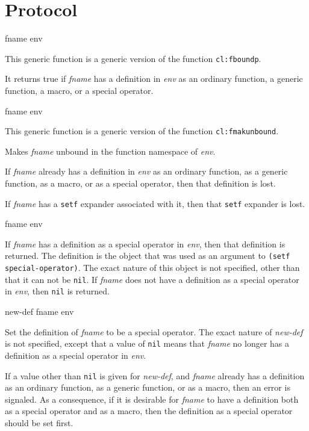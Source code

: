 \appendix

\section{Protocol}

 {fname env}

This generic function is a generic version of the \commonlisp{}
function \texttt{cl:fboundp}.

It returns true if \textit{fname} has a definition in
\textit{env} as an ordinary function, a generic function, a
macro, or a special operator.

 {fname env}

This generic function is a generic version of the \commonlisp{}
function \texttt{cl:fmakunbound}.

Makes \textit{fname} unbound in the function namespace of
\textit{env}.

If \textit{fname} already has a definition in
\textit{env} as an ordinary function, as a generic function,
as a macro, or as a special operator, then that definition is lost.

If \textit{fname} has a \texttt{setf} expander associated with
it, then that \texttt{setf} expander is lost.

 {fname env}

If \textit{fname} has a definition as a special operator in
\textit{env}, then that definition is returned.  The definition is
the object that was used as an argument to \texttt{(setf
  special-operator)}.  The exact nature of this object is not
specified, other than that it can not be \texttt{nil}.  If
\textit{fname} does not have a definition as a special operator in
\textit{env}, then \texttt{nil} is returned.

 {new-def fname env}

Set the definition of \textit{fname} to be a special operator.  The
exact nature of \textit{new-def} is not specified, except that a value
of \texttt{nil} means that \textit{fname} no longer has a definition
as a special operator in \textit{env}.

If a value other than \texttt{nil} is given for \textit{new-def}, and
\textit{fname} already has a definition as an ordinary function, as a
generic function, or as a macro, then an error is signaled.  As a
consequence, if it is desirable for \textit{fname} to have a
definition both as a special operator and as a macro, then the
definition as a special operator should be set first.

